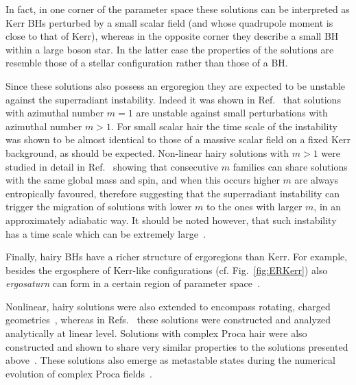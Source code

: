 \documentclass[11pt]{article}
\numberwithin{equation}{section} %
\begin{document}
In fact, in one corner of the parameter space these solutions can be interpreted as Kerr BHs perturbed by a small scalar 
field (and whose quadrupole moment is close to that of Kerr), whereas in the opposite corner they describe a small BH 
within a large boson star. In the latter case the properties of the solutions are resemble those of a stellar 
configuration rather than those of a BH.

Since these solutions also possess an ergoregion they are expected to be unstable against the superradiant instability. Indeed it was shown in Ref.~\cite{Ganchev:2017uuo} that solutions with azimuthal number $m=1$ are unstable against small perturbations with azimuthal number $m>1$. For small scalar hair the time scale of the instability was shown to be almost identical to those of a massive scalar field on a fixed Kerr background, as should be expected. Non-linear hairy solutions with $m>1$ were studied in detail in Ref.~\cite{Delgado:2019prc} showing that consecutive $m$ families can share solutions with the same global mass and spin, and when this occurs higher $m$ are always entropically favoured, therefore suggesting that the superradiant instability can trigger the migration of solutions with lower $m$ to the ones with larger $m$, in an approximately adiabatic way. It should be noted however,
that such instability has a time scale which can be extremely large~\cite{Degollado:2018ypf}.

Finally, hairy BHs have a richer structure of ergoregions
than Kerr. For example, besides the ergosphere of Kerr-like configurations (cf. Fig.~\ref{fig:ERKerr}) also 
\emph{ergosaturn} can form in a certain region of parameter space~\cite{Herdeiro:2014jaa}.

Nonlinear, hairy solutions were also extended to encompass rotating, charged geometries~\cite{Benone:2014ssa,Delgado:2016jxq}, whereas in Refs.~\cite{Hod:2014baa,Hod:2014sha} these solutions were constructed and analyzed analytically at linear level. 
Solutions with complex Proca hair were also constructed and shown to share very similar properties to the 
solutions presented above~\cite{Brito:2015pxa,Herdeiro:2016tmi}. These solutions also emerge as metastable states during the numerical evolution of complex Proca fields~\cite{East:2018glu}.



\end{document}

